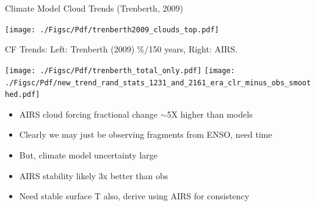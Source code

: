 \documentclass[10pt,t]{beamer}
\begin{document}
\begin{frame}[label={sec:orgd9a47e3}]{Climate Model Cloud Trends (Trenberth, 2009)}
\begin{center}
\texttt{[image: ./Figsc/Pdf/trenberth2009\_clouds\_top.pdf]}
\end{center}
\end{frame}

\begin{frame}{CF Trends: \small Left: Trenberth (2009) \%/150 years,   Right: AIRS}.

\vspace{-0.1in}
\texttt{[image: ./Figsc/Pdf/trenberth\_total\_only.pdf]}
\texttt{[image: ./Figsc/Pdf/new\_trend\_rand\_stats\_1231\_and\_2161\_era\_clr\_minus\_obs\_smoothed.pdf]}

\vspace{-0.1in}

\begin{footnotesize}
  \begin{itemize}
    \item  AIRS cloud forcing fractional change $\sim$5X higher than models
\item  Clearly we may just be observing fragments from ENSO, need time
\item But, climate model uncertainty large
\item  AIRS stability likely 3x better than obs
\item  Need stable surface T also, derive using AIRS for consistency
\end{itemize}
\end{footnotesize}


\end{frame}
\end{document}
